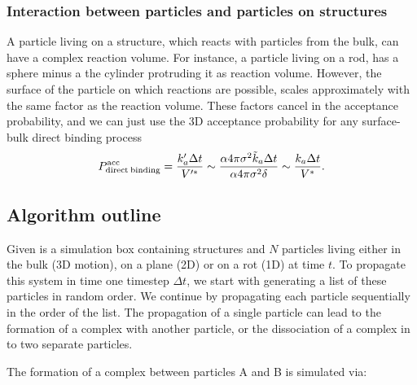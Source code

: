 \subsubsection{Interaction between particles and particles on structures}
A particle living on a structure, which reacts with particles from the bulk, can have a complex reaction volume. For instance, a particle living on a rod, has a sphere minus a the cylinder protruding it as reaction volume. However, the surface of the particle on which reactions are possible, scales approximately with the same factor as the reaction volume. These factors cancel in the acceptance probability, and we can just use the 3D acceptance probability for any surface-bulk direct binding process
\begin{equation}
 P^{\rm acc}_{\rm direct\:binding} = \frac{k'_a \Delta t}{V'^*} \sim \frac{ \alpha 4 \pi \sigma^2 \tilde{k}_a \Delta t}{\alpha 4 \pi \sigma^2 \delta} \sim \frac{k_a \Delta t}{V^*}.
\end{equation}


\subsection{Algorithm outline}
Given is a simulation box containing structures and $N$ particles living either in the bulk (3D motion), on a plane (2D) or on a rot (1D) at time $t$. To propagate this system in time one timestep $\Delta t$, we start with generating a list of these particles in random order. We continue by propagating each particle sequentially in the order of the list. The propagation of a single particle can lead to the formation of a complex with another particle, or the dissociation of a complex in to two separate particles. 

The formation of a complex between particles A and B is simulated via:

